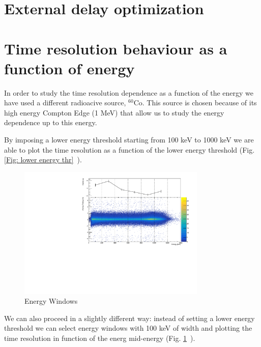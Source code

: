 \documentclass[a4paper,11pt]{article}
\begin{document}
\section*{External delay optimization}

\section*{Time resolution behaviour as a function of energy}
In order to study the time resolution dependence as a function of the energy we have used a different radioacive source, $^{60}$Co. This source is chosen because of its high energy Compton Edge (1 MeV) that allow us to study the energy dependence up to this energy. 

\smallskip

\noindent By imposing a lower energy threshold starting from 100 keV to 1000 keV we are able to plot the time resolution as a function of the lower energy threshold (Fig.\ref{Fig: lower energy thr}~).

\begin{figure}[h!]
\centering
\includegraphics[width = 0.8\textwidth]{SlicedTAC_FWHMvs2Ddist}
\caption{Energy Windows}
\label{fig: energy windows analog}
\end{figure}

\smallskip

\noindent We can also proceed in a slightly different way: instead of setting a lower energy threshold we can select energy windows with 100 keV of width and plotting the time resolution in function of the energ mid-energy (Fig. \ref{fig: energy windows analog}~).
\end{document}
